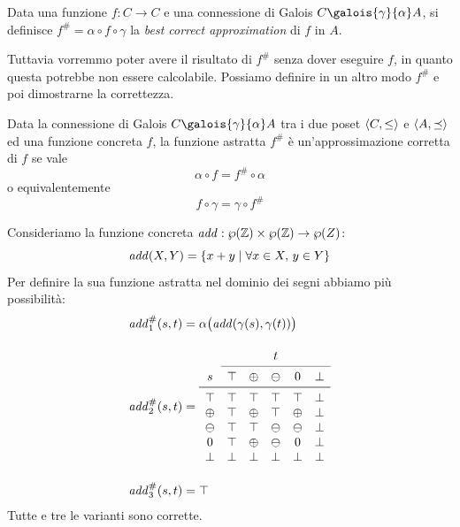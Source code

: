 \begin{definition}
Data una funzione $f : C \to C$ e una connessione di Galois $C \galois{\gamma}{\alpha} A$, si definisce $f^{\#} = \alpha \circ f \circ \gamma$ la \emph{best correct approximation} di $f$ in $A$.
\end{definition}

Tuttavia vorremmo poter avere il risultato di $f^{\#}$ senza dover eseguire $f$, in quanto questa potrebbe non essere calcolabile. Possiamo definire in un altro modo $f^{\#}$ e poi dimostrarne la correttezza.

\begin{definition}
Data la connessione di Galois $C \galois{\gamma}{\alpha} A$ tra i due poset $\langle C, \le \rangle$ e $\langle A, \preceq \rangle$ ed una funzione concreta $f$, la funzione astratta $f^{\#}$ è un'approssimazione corretta di $f$ se vale
\[ \alpha \circ f = f^{\#} \circ \alpha \]
o equivalentemente
\[ f \circ \gamma = \gamma \circ f^{\#} \]
\end{definition}

\begin{example}
Consideriamo la funzione concreta $\mathit{add} : \wp(\mathbb{Z}) \times \wp(\mathbb{Z}) \to \wp(Z)$:
\[ \mathit{add}(X, Y) = \{ x + y \mid \forall x \in X, \, y \in Y \} \]
Per definire la sua funzione astratta nel dominio dei segni abbiamo più possibilità:
\begin{align*}
    \fun{add}^{\#}_1(s, t) 
    & = \alpha\big(\fun{add}(\gamma(s), \gamma(t)) \big) \\[1em]
    \fun{add}^{\#}_2(s,t) 
    & = \begin{array}{c c c c c c}
             & \multicolumn{5}{c}{t}                       \\\cmidrule{2-6}
    s        & \top   & \oplus & \ominus & 0       & \bot  \\\midrule
    \top     & \top   & \top   & \top    & \top    & \bot  \\
    \oplus   & \top   & \oplus & \top    & \oplus  & \bot  \\
    \ominus  & \top   & \top   & \ominus & \ominus & \bot  \\
    0        & \top   & \oplus & \ominus & 0       & \bot  \\
    \bot     & \bot   & \bot   & \bot    & \bot    & \bot  \\
\end{array} \\[1em]
    \fun{add}^{\#}_3(s,t) 
    & = \top
\end{align*}
Tutte e tre le varianti sono corrette. 
\end{example}

